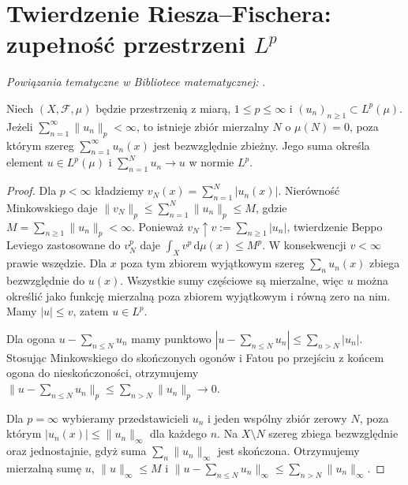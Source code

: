 \section{Twierdzenie Riesza--Fischera: zupełność przestrzeni \texorpdfstring{$L^p$}{L\string^p}}

\noindent\emph{Powiązania tematyczne w Bibliotece matematycznej:} .


\begin{twierdzenie}
\label{thm:series-lp-14}
Niech $(X,\mathcal F,\mu)$ będzie przestrzenią z miarą,
$1\le p\le\infty$ i $(u_n)_{n\ge1}\subset L^p(\mu)$.
Jeżeli $\sum_{n=1}^\infty\|u_n\|_p<\infty$,
to istnieje zbiór mierzalny $N$ o $\mu(N)=0$,
poza którym szereg $\sum_{n=1}^\infty u_n(x)$
jest bezwzględnie zbieżny. Jego suma określa element $u\in L^p(\mu)$
i $\sum_{n=1}^N u_n\to u$ w normie $L^p$.
\end{twierdzenie}
\begin{proof}
Dla $p<\infty$ kładziemy $v_N(x)=\sum_{n=1}^N|u_n(x)|$.
Nierówność Minkowskiego daje
$\|v_N\|_p\le\sum_{n=1}^N\|u_n\|_p\le M$,
gdzie $M=\sum_{n\ge1}\|u_n\|_p<\infty$.
Ponieważ $v_N\uparrow v:=\sum_{n\ge1}|u_n|$,
twierdzenie Beppo Leviego zastosowane do $v_N^p$ daje
$\int_Xv^p\,\mathrm d\mu(x)\le M^p$.
W konsekwencji $v<\infty$ prawie wszędzie.
Dla $x$ poza tym zbiorem wyjątkowym szereg
$\sum_nu_n(x)$ zbiega bezwzględnie do $u(x)$.
Wszystkie sumy częściowe są mierzalne, więc $u$
można określić jako funkcję mierzalną poza zbiorem
wyjątkowym i równą zero na nim. Mamy $|u|\le v$,
zatem $u\in L^p$.

Dla ogona $u-\sum_{n\le N}u_n$ mamy punktowo
$|u-\sum_{n\le N}u_n|\le\sum_{n>N}|u_n|$.
Stosując Minkowskiego do skończonych ogonów
i Fatou po przejściu z końcem ogona do nieskończoności,
otrzymujemy
$\|u-\sum_{n\le N}u_n\|_p\le\sum_{n>N}\|u_n\|_p\to0$.

Dla $p=\infty$ wybieramy przedstawicieli $u_n$
i jeden wspólny zbiór zerowy $N$, poza którym
$|u_n(x)|\le\|u_n\|_\infty$ dla każdego $n$.
Na $X\setminus N$ szereg zbiega bezwzględnie
oraz jednostajnie, gdyż suma $\sum_n\|u_n\|_\infty$
jest skończona. Otrzymujemy mierzalną sumę $u$,
$\|u\|_\infty\le M$ i
$\|u-\sum_{n\le N}u_n\|_\infty\le\sum_{n>N}\|u_n\|_\infty$.
\end{proof}

